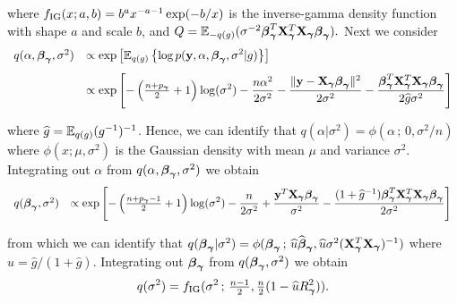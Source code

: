\documentclass{article}[12pt]
\begin{document}
\noindent where $f_{\mbox{\scriptsize IG}}( x ; a, b) = b^a x^{-a-1}\exp(-b/x)$
is the inverse-gamma density function with shape $a$ and scale $b$, and 
$Q = {\mathbb E}_{-q(g)}( \sigma^{-2} {\boldsymbol \beta}_{\boldsymbol \gamma}^T{\bf X}_{\boldsymbol \gamma}^T{\bf X}_{\boldsymbol \gamma}{\boldsymbol \beta}_{\boldsymbol \gamma} ).$
Next we consider
$$
\begin{array}{rl}
q(\alpha,{\boldsymbol \beta}_{\boldsymbol \gamma},\sigma^2)
& \displaystyle \propto \exp\left[
{\mathbb E}_{q(g)}\left\{
\log p({\bf y},\alpha,{\boldsymbol \beta}_{\boldsymbol \gamma},\sigma^2|g)
\right\}
\right]
\\ [2ex]
& \displaystyle \propto \exp\left[
- \left( \tfrac{n+p_{\boldsymbol \gamma}}{2} + 1\right)\log(\sigma^2) 
- \frac{n\alpha^2}{2\sigma^2} 
- \frac{\|{\bf y} - {\bf X}_{\boldsymbol \gamma}{\boldsymbol \beta}_{\boldsymbol \gamma}\|^2}{2\sigma^2}
- \frac{{\boldsymbol \beta}_{\boldsymbol \gamma}^T{\bf X}_{\boldsymbol \gamma}^T{\bf X}_{\boldsymbol \gamma}{\boldsymbol \beta}_{\boldsymbol \gamma}}{2 \widehat{g}\sigma^2}
\right]
\end{array} 
$$

\noindent where $\widehat{g} = {\mathbb E}_{q(g)}(g^{-1})^{-1}$. Hence, we can identify that
$q(\alpha|\sigma^2) = \phi(\alpha \, ; \, 0,\sigma^2/n)$
where $\phi(x;\mu,\sigma^2)$ is the Gaussian density with mean $\mu$
and variance $\sigma^2$.
Integrating out $\alpha$ from $q(\alpha,{\boldsymbol \beta}_{\boldsymbol \gamma},\sigma^2)$ we obtain
$$
\begin{array}{rl}
q({\boldsymbol \beta}_{\boldsymbol \gamma},\sigma^2)
& \displaystyle \propto 
\exp\left[
- \left( \tfrac{n+p_{\boldsymbol \gamma}-1}{2} + 1\right)\log(\sigma^2) 
- \frac{n}{2\sigma^2}
+ \frac{{\bf y}^T{\bf X}_{\boldsymbol \gamma}{\boldsymbol \beta}_{\boldsymbol \gamma}}{\sigma^2}
- \frac{(1 + \widehat{g}^{-1}){\boldsymbol \beta}_{\boldsymbol \gamma}^T{\bf X}_{\boldsymbol \gamma}^T{\bf X}_{\boldsymbol \gamma}{\boldsymbol \beta}_{\boldsymbol \gamma}}{2\sigma^2}
\right]
\end{array} 
$$

\noindent from which we can identify that
$q({\boldsymbol \beta}_{\boldsymbol \gamma}|\sigma^2) = \phi( {\boldsymbol \beta}_{\boldsymbol \gamma} \, ; \, \widehat{u} \widehat{{\boldsymbol \beta}}_{\boldsymbol \gamma},  \widehat{u} \sigma^2 ({\bf X}_{\boldsymbol \gamma}^T{\bf X}_{\boldsymbol \gamma})^{-1})$
where $\widehat{u} = \widehat{g}/(1 + \widehat{g})$.
Integrating out ${\boldsymbol \beta}_{\boldsymbol \gamma}$ from $q({\boldsymbol \beta}_{\boldsymbol \gamma},\sigma^2)$
we obtain
$$
q(\sigma^2) = f_{\mbox{\scriptsize IG}}(\sigma^2 \, ; \, 
\tfrac{n-1}{2},
\tfrac{n}{2}( 1 - \widehat{u} R_{\boldsymbol \gamma}^2)).
$$
\end{document}
